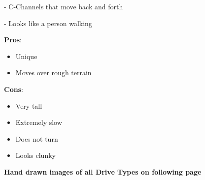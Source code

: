 - C-Channels that move back and forth

- Looks like a person walking

\noindent
\textbf{Pros}:
\begin{itemize} 
    \item Unique 
    \item Moves over rough terrain
\end{itemize}
\textbf{Cons}:
\begin{itemize}
    \item Very tall
    \item Extremely slow
    \item Does not turn
    \item Looks clunky
\end{itemize}
\begin{center}
    \textbf{Hand drawn images of all Drive Types on following page}
\end{center}
\pagebreak
